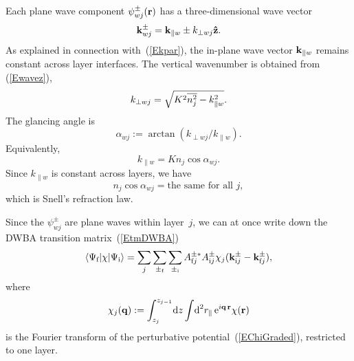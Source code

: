 Each plane wave component $\psi^\pm_{wj}(\mathbf{r})$ has
a three-dimensional wave vector
\begin{equation}\label{Ekpmwj3}
  \mathbf{k}^\pm_{wj}= \mathbf{k}_{\parallel w} \pm k_{\perp wj}\mathbf{\hat z}.
\end{equation}
%
%
As explained in connection with~(\ref{Ekpar}),
the in-plane wave vector $\mathbf{k}_{\parallel w}$ remains constant
across layer interfaces.
The vertical wavenumber is obtained from (\ref{Ewavez}),
\begin{equation}\label{Ekperpwj}
  k_{\perp wj} = \sqrt{K^2 \overline{n_j^2} - k_{\parallel w}^2}.
\end{equation}
The glancing angle is
\begin{equation}\label{Edef_alpha}
  \alpha_{wj}:=\arctan(k_{\perp wj}/k_{\parallel w}).  
\end{equation}
Equivalently,
\begin{equation}
  k_{\parallel w}=K n_j \cos\alpha_{wj}. 
\end{equation}
Since $k_{\parallel w}$ is constant across layers,
we have
\begin{equation}\label{ESnell}
  n_j \cos\alpha_{wj} = \text{the same for all }j,
\end{equation}
which is Snell's refraction law.

Since the $\psi^\pm_{wj}$ are plane waves within layer~$j$,
we can at once write down the DWBA transition matrix~(\ref{EtmDWBA})
%
\begin{equation}\label{EtmDWBAft0}
  \left\langle \Psi_{\text{f}}|\chi|\Psi_{\text{i}}\right\rangle
  = \sum_{j} \sum_{\pm_{\text{f}}} \sum_{\pm_{\text{i}}}
    A^{\pm *}_{\text{f} j} A^\pm_{\text{i} j} 
     \chi_j(\mathbf{k}^\pm_{\text{i} j}-\mathbf{k}^\pm_{\text{f} j}),
\end{equation}
where
\begin{equation}\label{Echij}
  \chi_j(\mathbf{q})
  := \int_{z_j}^{z_{j-1}}\!\text{d} z \int\!\text{d}^2r_\parallel\, \text{e}^{i\mathbf{q}\,\mathbf{r}}\chi(\mathbf{r})
\end{equation}
%
is the Fourier transform
of the perturbative potential~(\ref{EChiGraded}),
restricted to one layer.


